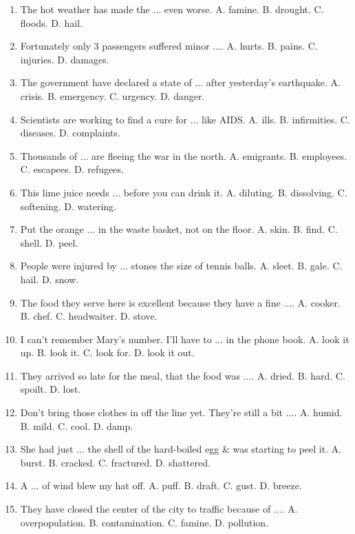 \documentclass{article}
\numberwithin{equation}{section}
\begin{document}
\begin{enumerate}[leftmargin=8mm]
	\item The hot weather has made the $\ldots$ even worse. {\sf A.} famine. {\sf B.} drought. {\sf C.} floods. {\sf D.} hail.
	\item Fortunately only 3 passengers suffered minor $\ldots$. {\sf A.} hurts. {\sf B.} pains. {\sf C.} injuries. {\sf D.} damages.
	\item The government have declared a state of $\ldots$ after yesterday's earthquake. {\sf A.} crisis. {\sf B.} emergency. {\sf C.} urgency. {\sf D.} danger.
	\item Scientists are working to find a cure for $\ldots$ like AIDS. {\sf A.} ills. {\sf B.} infirmities. {\sf C.} diseases. {\sf D.} complaints.
	\item Thousands of $\ldots$ are fleeing the war in the north. {\sf A.} emigrants. {\sf B.} employees. {\sf C.} escapees. {\sf D.} refugees.
	\item This lime juice needs $\ldots$ before you can drink it. {\sf A.} diluting. {\sf B.} dissolving. {\sf C.} softening. {\sf D.} watering.
	\item Put the orange $\ldots$ in the waste basket, not on the floor. {\sf A.} skin. {\sf B.} find. {\sf C.} shell. {\sf D.} peel.
	\item People were injured by $\ldots$ stones the size of tennis balls. {\sf A.} sleet. {\sf B.} gale. {\sf C.} hail. {\sf D.} snow.
	\item The food they serve here is excellent because they have a fine $\ldots$. {\sf A.} cooker. {\sf B.} chef. {\sf C.} headwaiter. {\sf D.} stove.
	\item I can't remember Mary's number. I'll have to $\ldots$ in the phone book. {\sf A.} look it up. {\sf B.} look it. {\sf C.} look for. {\sf D.} look it out.
	\item They arrived so late for the meal, that the food was $\ldots$. {\sf A.} dried. {\sf B.} hard. {\sf C.} spoilt. {\sf D.} lost.
	\item Don't bring those clothes in off the line yet. They're still a bit $\ldots$. {\sf A.} humid. {\sf B.} mild. {\sf C.} cool. {\sf D.} damp.
	\item She had just $\ldots$ the shell of the hard-boiled egg \& was starting to peel it. {\sf A.} burst. {\sf B.} cracked. {\sf C.} fractured. {\sf D.} shattered.
	\item A $\ldots$ of wind blew my hat off. {\sf A.} puff. {\sf B.} draft. {\sf C.} gust. {\sf D.} breeze.
	\item They have closed the center of the city to traffic because of $\ldots$. {\sf A.} overpopulation. {\sf B.} contamination. {\sf C.} famine. {\sf D.} pollution.

\end{enumerate}
\end{document}
